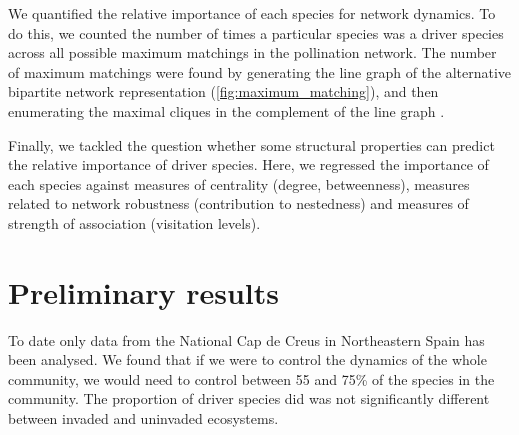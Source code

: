 \documentclass[a4paper,10pt]{article}
\begin{document}
We quantified the relative importance of each species for network dynamics. To do this, we counted the number of times a particular species was a driver species across all possible maximum matchings in the pollination network. The number of maximum matchings were found by generating the line graph of the alternative bipartite network representation (\autoref{fig:maximum_matching}), and then enumerating the maximal cliques in the complement of the line graph \autocite{Csardi2006}. 

Finally, we tackled the question whether some structural properties can predict the relative importance of driver species. Here, we regressed the importance of each species against measures of centrality (degree, betweenness), measures related to network robustness (contribution to nestedness) and measures of strength of association (visitation levels). 

\section*{Preliminary results} 

To date only data from the National Cap de Creus in Northeastern Spain has been analysed. We found that if we were to control the dynamics of the whole community, we would need to control between 55 and 75\% of the species in the community. The proportion of driver species did was not significantly different between invaded and uninvaded ecosystems. 

\end{document}
